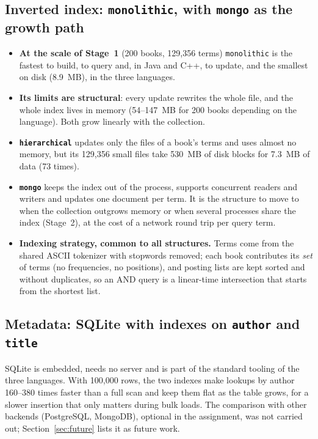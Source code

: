 \documentclass[11pt,a4paper]{article}
\newcommand{\code}[1]{\texttt{#1}}
\begin{document}
\subsection{Inverted index: \code{monolithic}, with \code{mongo} as the growth path}
\begin{itemize}
  \item \textbf{At the scale of Stage~1} (200 books, 129,356 terms) \code{monolithic} is the fastest to
        build, to query and, in Java and C++, to update, and the smallest on disk (8.9~MB), in the
        three languages.
  \item \textbf{Its limits are structural}: every update rewrites the whole file, and the whole index
        lives in memory (54--147~MB for 200 books depending on the language). Both grow linearly with
        the collection.
  \item \textbf{\code{hierarchical}} updates only the files of a book's terms and uses almost no memory,
        but its 129,356 small files take 530~MB of disk blocks for 7.3~MB of data (73 times).
  \item \textbf{\code{mongo}} keeps the index out of the process, supports concurrent readers and
        writers and updates one document per term. It is the structure to move to when the
        collection outgrows memory or when several processes share the index (Stage~2), at the cost
        of a network round trip per query term.
  \item \textbf{Indexing strategy, common to all structures.} Terms come from the shared ASCII
        tokenizer with stopwords removed; each book contributes its \emph{set} of terms (no
        frequencies, no positions), and posting lists are kept sorted and without duplicates, so an
        AND query is a linear-time intersection that starts from the shortest list.
\end{itemize}

\subsection{Metadata: SQLite with indexes on \code{author} and \code{title}}
SQLite is embedded, needs no server and is part of the standard tooling of the three languages.
With 100,000 rows, the two indexes make lookups by author 160--380 times faster than a full scan and
keep them flat as the table grows, for a slower insertion that only matters during bulk loads. The
comparison with other backends (PostgreSQL, MongoDB), optional in the assignment, was not carried
out; Section~\ref{sec:future} lists it as future work.
\end{document}
